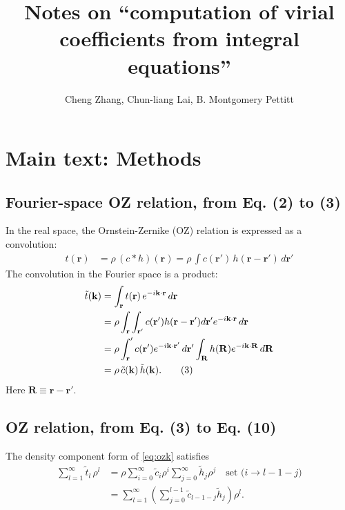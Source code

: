 \documentclass[preprint]{revtex4-1}
\numberwithin{equation}{subsection}
\numberwithin{table}{section}
\newcommand{\vct}[1]{\mathbf{#1}}
\providecommand{\vr}{} %
\renewcommand{\vr}{\vct{r}}
\newcommand{\vk}{\vct{k}}
\newcommand{\vR}{\vct{R}}
\begin{document}
\title{Notes on ``computation of virial coefficients from integral equations''}
\author{Cheng Zhang, Chun-liang Lai, B. Montgomery Pettitt}

\maketitle

\tableofcontents

\section{Main text: Methods}


\subsection{Fourier-space OZ relation, from Eq. (2) to (3)}

In the real space, the Ornstein-Zernike (OZ) relation
is expressed as a convolution:
\begin{align}
  t(\vr)
&= \rho \, (c*h)(\vr)
= \rho \, \int c(\vr') \, h(\vr - \vr') \, d\vr'
  \tag{2}
  \label{eq:oz}
\end{align}
The convolution in the Fourier space is a product:
\begin{align}
  \tilde{t}(\vk)
&= \int_\vr t(\vr) \, e^{-i\vk \cdot \vr} \, d\vr
  \notag \\
&= \rho \int_\vr \int_{\vr'} c(\vr') h(\vr - \vr') d\vr' e^{-i\vk \cdot \vr} \, d\vr
  \notag \\
&= \rho \int_\vr' c(\vr') e^{-i\vk \cdot \vr'} \, d\vr'
        \int_\vR h(\vR) e^{-i\vk \cdot \vR} \, d\vR
  \notag \\
&= \rho \, \tilde{c}(\vk) \, \tilde{h}(\vk).
  \tag{3}
  \label{eq:ozk}
\end{align}
%
Here $\vR \equiv \vr - \vr'$.



\subsection{OZ relation, from Eq. (3) to Eq. (10)}

The density component form of \eqref{eq:ozk} satisfies
\begin{align*}
  \sum_{l = 1}^{\infty} \tilde{t}_l \, \rho^l
  &=
  \rho \sum_{i = 0}^{\infty} \tilde{c}_i \rho^i
  \sum_{j = 0}^{\infty} \tilde{h}_j \rho^j
  \quad \mbox{set ($i \rightarrow l - 1 - j$)}
  \\
  &=
  \sum_{l = 1}^{\infty}
  \left(
  \sum_{j = 0}^{l-1}
    \tilde{c}_{l-1-j} \tilde{h}_j \right) \rho^l.
\end{align*}
\end{document}
